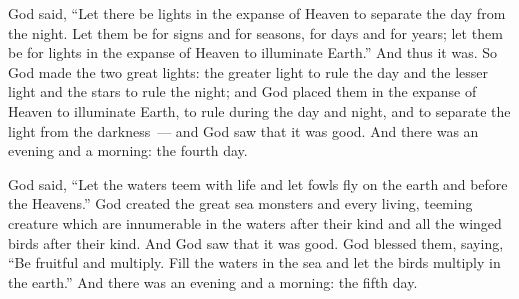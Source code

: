 \begin{inparaenum}
     God said, ``Let there be lights in the expanse of Heaven to separate the day from the night. Let them be for signs and for seasons, for days and for years;%
     let them be for lights in the expanse of Heaven to illuminate Earth.'' And thus it was.%
     So God made the two great lights: the greater light to rule the day and the lesser light and the stars to rule the night;%
     and God placed them in the expanse of Heaven to illuminate Earth,%
     to rule during the day and night, and to separate the light from the darkness~--- and God saw that it was good.%
     And there was an evening and a morning: the fourth day.%
    
     God said, ``Let the waters teem with life and let fowls fly on the earth and before the Heavens.''%
     God created the great sea monsters and every living, teeming creature which are innumerable in the waters after their kind and all the winged birds after their kind. And God saw that it was good.%
     God blessed them, saying, ``Be fruitful and multiply. Fill the waters in the sea and let the birds multiply in the earth.''%
     And there was an evening and a morning: the fifth day.%
    

\end{inparaenum}
